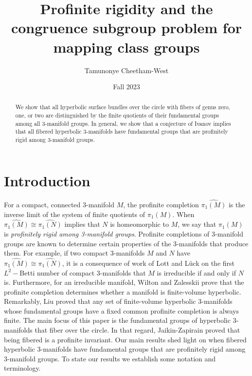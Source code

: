 \documentclass[12pt, reqno,oneside]{amsart}
\title{Profinite rigidity and the congruence subgroup problem for mapping class groups}
\author{Tamunonye Cheetham-West}
\date{Fall 2023}
\theoremstyle{definition}
\theoremstyle{plain}
\theoremstyle{TheoremNum}
\numberwithin{equation}{section}
\numberwithin{table}{section}
\begin{document}
\maketitle
\begin{abstract}
    We show that all hyperbolic surface bundles over the circle with fibers of genus zero, one, or two are distinguished by the finite quotients of their fundamental groups among all 3-manifold groups. In general, we show that a conjecture of Ivanov implies that all fibered hyperbolic 3-manifolds have fundamental groups that are profinitely rigid among 3-manifold groups. 
\end{abstract}



\section{Introduction}
\noindent For a compact, connected 3-manifold $M$, the profinite completion $\widehat{\pi_1(M)}$ is the inverse limit of the system of finite quotients of $\pi_1(M)$. When $\widehat{\pi_1(M)}\cong\widehat{\pi_1(N)}$ implies that $N$ is homeomorphic to $M$, we say that $\pi_1(M)$ is {\it profinitely rigid among 3-manifold groups}. 
\medbreak Profinite completions of 3-manifold groups are known to determine certain properties of the 3-manifolds that produce them. For example, if two compact 3-manifolds $M$ and $N$ have $\widehat{\pi_1(M)}\cong\widehat{\pi_1(N)}$, it is a consequence of work of Lott and L{\"u}ck \cite{Luck1995} \cite{LuckApprox} on the first $L^2-$Betti number of compact 3-manifolds that $M$ is irreducible if and only if $N$ is. Furthermore, for an irreducible manifold, Wilton and Zalesskii \cite{WZ1} prove that the profinite completion determines whether a manifold is finite-volume hyperbolic. Remarkably, Liu \cite{Y} proved that any set of finite-volume hyperbolic 3-manifolds whose fundamental groups have a fixed common profinite completion is always finite. 
\medbreak The main focus of this paper is the fundamental groups of hyperbolic 3-manifolds that fiber over the circle. In that regard, Jaikin-Zapirain \cite{JZ} proved that being fibered is a profinite invariant. Our main results shed light on when fibered hyperbolic 3-manifolds have fundamental groups that are profinitely rigid among 3-manifold groups. To state our results we establish some notation and terminology. 
\end{document}
